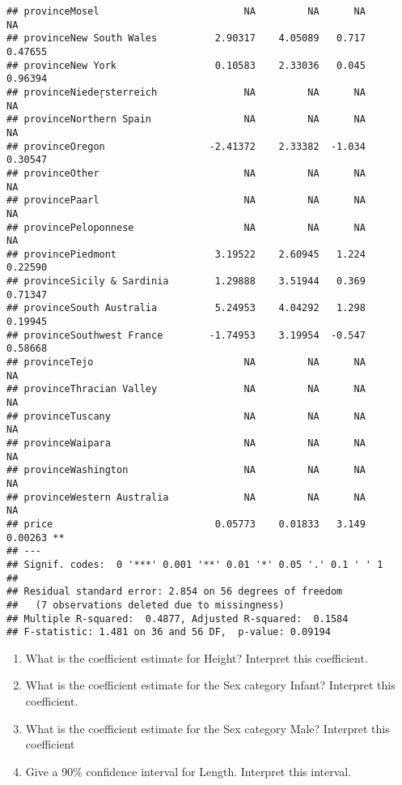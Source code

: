 \documentclass[]{article}
\begin{document}
\begin{verbatim}
## provinceMosel                         NA         NA      NA       NA    
## provinceNew South Wales          2.90317    4.05089   0.717  0.47655    
## provinceNew York                 0.10583    2.33036   0.045  0.96394    
## provinceNieder̦sterreich               NA         NA      NA       NA    
## provinceNorthern Spain                NA         NA      NA       NA    
## provinceOregon                  -2.41372    2.33382  -1.034  0.30547    
## provinceOther                         NA         NA      NA       NA    
## provincePaarl                         NA         NA      NA       NA    
## provincePeloponnese                   NA         NA      NA       NA    
## provincePiedmont                 3.19522    2.60945   1.224  0.22590    
## provinceSicily & Sardinia        1.29888    3.51944   0.369  0.71347    
## provinceSouth Australia          5.24953    4.04292   1.298  0.19945    
## provinceSouthwest France        -1.74953    3.19954  -0.547  0.58668    
## provinceTejo                          NA         NA      NA       NA    
## provinceThracian Valley               NA         NA      NA       NA    
## provinceTuscany                       NA         NA      NA       NA    
## provinceWaipara                       NA         NA      NA       NA    
## provinceWashington                    NA         NA      NA       NA    
## provinceWestern Australia             NA         NA      NA       NA    
## price                            0.05773    0.01833   3.149  0.00263 ** 
## ---
## Signif. codes:  0 '***' 0.001 '**' 0.01 '*' 0.05 '.' 0.1 ' ' 1
## 
## Residual standard error: 2.854 on 56 degrees of freedom
##   (7 observations deleted due to missingness)
## Multiple R-squared:  0.4877, Adjusted R-squared:  0.1584 
## F-statistic: 1.481 on 36 and 56 DF,  p-value: 0.09194
\end{verbatim}

\begin{enumerate}
\def\labelenumi{(\alph{enumi})}
\item
  What is the coefficient estimate for Height? Interpret this
  coefficient.
\item
  What is the coefficient estimate for the Sex category Infant?
  Interpret this coefficient.
\item
  What is the coefficient estimate for the Sex category Male? Interpret
  this coefficient
\item
  Give a 90\% confidence interval for Length. Interpret this interval.
\end{enumerate}
\end{document}
